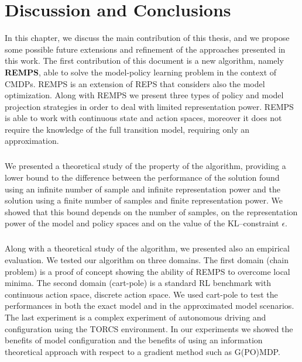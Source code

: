 \chapter{Discussion and Conclusions}
\label{capitolo7}
\thispagestyle{empty}
\vspace{0.5cm}

\noindent In this chapter, we discuss the main contribution of this thesis, and we propose some possible future extensions and refinement of the approaches presented in this work. 
The first contribution of this document is a new algorithm, namely \textbf{REMPS}, able to solve the model-policy learning problem in the context of CMDPs. 
REMPS is an extension of REPS \citep{reps} that considers also the model optimization. Along with REMPS we present three types of policy and model projection strategies in order to deal with limited representation power. 
REMPS is able to work with continuous state and action spaces, moreover it does not require the knowledge of the full transition model, requiring only an approximation.
\paragraph{}
We presented a theoretical study of the property of the algorithm, providing a lower bound to the difference between the performance of the solution found using an infinite number of sample and infinite representation power and the solution using a finite number of samples and finite representation power. We showed that this bound depends on the number of samples, on the representation power of the model and policy spaces and on the value of the KL--constraint $\epsilon$. \newline
\paragraph{}
Along with a theoretical study of the algorithm, we presented also an empirical evaluation. We tested our algorithm on three domains. The first domain (chain problem) is a proof of concept showing the ability of REMPS to overcome local minima. The second domain (cart-pole) is a standard RL benchmark with continuous action space, discrete action space. We used cart-pole to test the performances in both the exact model and in the approximated model scenarios. The last experiment is a complex experiment of autonomous driving and configuration using the TORCS environment.
In our experiments we showed the benefits of model configuration and the benefits of using an information theoretical approach with respect to a gradient method such as G(PO)MDP.
